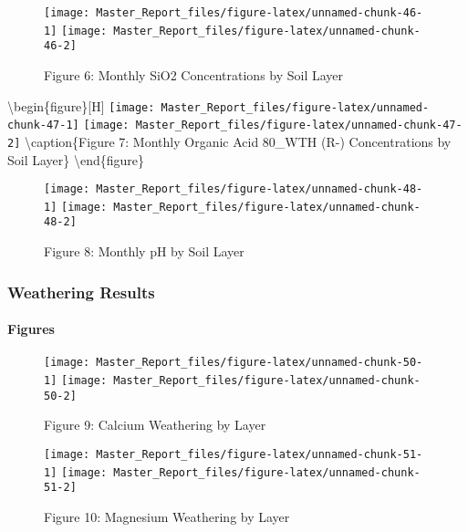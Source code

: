 \documentclass[
]{article}
\begin{document}
\begin{figure}[H]
\texttt{[image: Master\_Report\_files/figure-latex/unnamed-chunk-46-1]} \texttt{[image: Master\_Report\_files/figure-latex/unnamed-chunk-46-2]} \caption{Figure 6: Monthly SiO2 Concentrations by Soil Layer}\label{fig:unnamed-chunk-46}
\end{figure}

\textbackslash begin\{figure\}{[}H{]}
\texttt{[image: Master\_Report\_files/figure-latex/unnamed-chunk-47-1]}
\texttt{[image: Master\_Report\_files/figure-latex/unnamed-chunk-47-2]}
\textbackslash caption\{Figure 7: Monthly Organic Acid 80\_WTH (R-)
Concentrations by Soil Layer\}\label{fig:unnamed-chunk-47}
\textbackslash end\{figure\}

\begin{figure}[H]
\texttt{[image: Master\_Report\_files/figure-latex/unnamed-chunk-48-1]} \texttt{[image: Master\_Report\_files/figure-latex/unnamed-chunk-48-2]} \caption{Figure 8: Monthly pH by Soil Layer}\label{fig:unnamed-chunk-48}
\end{figure}

\hypertarget{weathering-results-1}{%
\subsubsection{Weathering Results}\label{weathering-results-1}}

\hypertarget{figures-1}{%
\paragraph{Figures}\label{figures-1}}

\begin{figure}[H]
\texttt{[image: Master\_Report\_files/figure-latex/unnamed-chunk-50-1]} \texttt{[image: Master\_Report\_files/figure-latex/unnamed-chunk-50-2]} \caption{Figure 9: Calcium Weathering by Layer}\label{fig:unnamed-chunk-50}
\end{figure}

\begin{figure}[H]
\texttt{[image: Master\_Report\_files/figure-latex/unnamed-chunk-51-1]} \texttt{[image: Master\_Report\_files/figure-latex/unnamed-chunk-51-2]} \caption{Figure 10: Magnesium Weathering by Layer}\label{fig:unnamed-chunk-51}
\end{figure}
\end{document}
